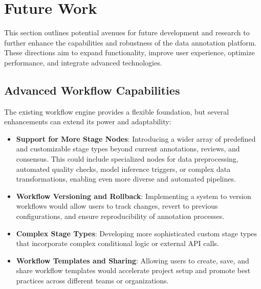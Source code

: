 \section{Future Work}
\label{sec:future_work}

This section outlines potential avenues for future development and research to further enhance the capabilities and robustness of the data annotation platform. These directions aim to expand functionality, improve user experience, optimize performance, and integrate advanced technologies.

\subsection{Advanced Workflow Capabilities}
The existing workflow engine provides a flexible foundation, but several enhancements can extend its power and adaptability:
\begin{itemize}
    \item \textbf{Support for More Stage Nodes}: Introducing a wider array of predefined and customizable stage types beyond current annotations, reviews, and consensus. This could include specialized nodes for data preprocessing, automated quality checks, model inference triggers, or complex data transformations, enabling even more diverse and automated pipelines.
    \item \textbf{Workflow Versioning and Rollback}: Implementing a system to version workflows would allow users to track changes, revert to previous configurations, and ensure reproducibility of annotation processes.
    \item \textbf{Complex Stage Types}: Developing more sophisticated custom stage types that incorporate complex conditional logic or external API calls.
    \item \textbf{Workflow Templates and Sharing}: Allowing users to create, save, and share workflow templates would accelerate project setup and promote best practices across different teams or organizations.
\end{itemize}


